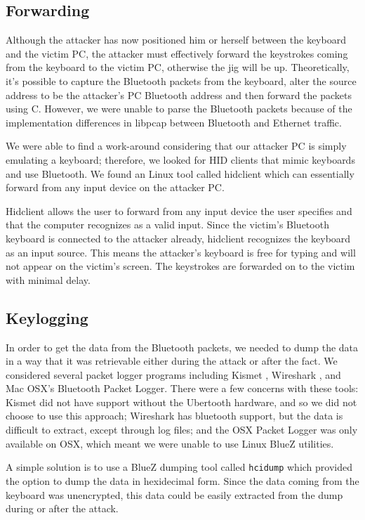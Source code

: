 \documentclass{acm_proc_article-sp}
\begin{document}
\subsection{Forwarding}
Although the attacker has now positioned him or herself between the keyboard and the victim PC, the attacker must effectively forward the keystrokes coming from the keyboard to the victim PC, otherwise the jig will be up.   
Theoretically, it's possible to capture the Bluetooth packets from the keyboard, alter the source address to be the attacker's PC Bluetooth address and then forward the packets using C. However, we were unable to parse the Bluetooth packets because of the implementation differences in libpcap between Bluetooth and Ethernet traffic. 

We were able to find a work-around considering that our attacker PC is simply emulating a keyboard; therefore, we looked for HID clients that mimic keyboards and use Bluetooth. We found an Linux tool called hidclient \cite{hidclient} which can essentially forward from any input device on the attacker PC. 

Hidclient allows the user to forward from any input device the user specifies and that the computer recognizes as a valid input. Since the victim's Bluetooth keyboard is connected to the attacker already, hidclient recognizes the keyboard as an input source. This means the attacker's keyboard is free for typing and will not appear on the victim's screen. The keystrokes are forwarded on to the victim with minimal delay. 

\subsection{Keylogging}
In order to get the data from the Bluetooth packets, we needed to dump the data in a way that it was retrievable either during the attack or after the fact. We considered several packet logger programs including Kismet \cite{kismet}, Wireshark \cite{wireshark}, and Mac OSX's Bluetooth Packet Logger. There were a few concerns with these tools: Kismet did not have support without the Ubertooth hardware, and so we did not choose to use this approach; Wireshark has bluetooth support, but the data is difficult to extract, except through log files; and the OSX Packet Logger was only available on OSX, which meant we were unable to use Linux BlueZ utilities. 

A simple solution is to use a BlueZ dumping tool called \texttt{hcidump} which provided the option to dump the data in hexidecimal form. Since the data coming from the keyboard was unencrypted, this data could be easily extracted from the dump during or after the attack. 
\end{document}
